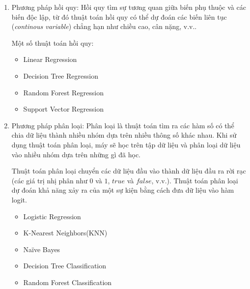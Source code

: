 \begin{enumerate}
    \item Phương pháp hồi quy:
          Hồi quy tìm sự tương quan giữa biến phụ thuộc và các biến độc lập, từ đó thuật toán hồi quy có thể dự đoán các biến liên tục (\textit{continous variable}) chẳng hạn như chiều cao, cân nặng, v.v.. \cite{webpage1}

          Một số thuật toán hồi quy:
          \begin{itemize}
              \item Linear Regression
              \item Decision Tree Regression
              \item Random Forest Regression
              \item Support Vector Regression
          \end{itemize}
    \item Phương pháp phân loại:
          Phân loại là thuật toán tìm ra các hàm số có thể chia dữ liệu thành nhiều nhóm dựa trên nhiều thông số khác nhau. Khi sử dụng thuật toán phân loại, máy sẽ học trên tập dữ liệu và phân loại dữ liệu vào nhiều nhóm dựa trên những gì đã học.

          Thuật toán phân loại chuyển các dữ liệu đầu vào thành dữ liệu đầu ra rời rạc (các giá trị nhị phân như $0$ và $1$, $true$ và $false$, v.v.). Thuật toán phân loại dự đoán khả năng xảy ra của một sự kiện bằng cách đưa dữ liệu vào hàm logit.\cite{webpage1}
          \begin{itemize}
              \item Logistic Regression
              \item K-Nearest Neighbors(KNN)
              \item Naïve Bayes
              \item Decision Tree Classification
              \item Random Forest Classification
          \end{itemize}
\end{enumerate}

